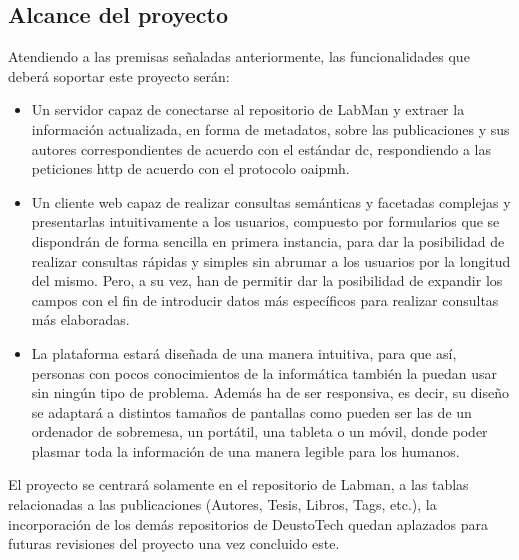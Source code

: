 \subsection{Alcance del proyecto}

Atendiendo a las premisas señaladas anteriormente, las funcionalidades que deberá soportar este proyecto serán:

\begin{itemize}
	\item Un servidor capaz de conectarse al repositorio de LabMan y extraer la información actualizada, en forma de metadatos, sobre las publicaciones y sus autores correspondientes de acuerdo con el estándar \acrlong{dc}\cite{DC}, respondiendo a las peticiones \acrshort{http} de acuerdo con el protocolo \acrshort{oaipmh}.
	
	\item Un cliente web capaz de realizar consultas semánticas y facetadas complejas y presentarlas intuitivamente a los usuarios, compuesto por formularios que se dispondrán de forma sencilla en primera instancia, para dar la posibilidad de realizar consultas rápidas y simples sin abrumar a los usuarios por la longitud del mismo. Pero, a su vez, han de permitir dar la posibilidad de expandir los campos con el fin de introducir datos más específicos para realizar consultas más elaboradas.

	\item La plataforma estará diseñada de una manera intuitiva, para que así, personas con pocos conocimientos de la informática también la puedan usar sin ningún tipo de problema. Además ha de ser responsiva, es decir, su diseño se adaptará a distintos tamaños de pantallas como pueden ser las de un ordenador de sobremesa, un portátil, una tableta o un móvil, donde poder plasmar toda la información de una manera legible para los humanos.
\end{itemize}

El proyecto se centrará solamente en el repositorio de Labman, a las tablas relacionadas a las publicaciones (Autores, Tesis, Libros, Tags, etc.), la incorporación de los demás repositorios de DeustoTech quedan aplazados para futuras revisiones del proyecto una vez concluido este.